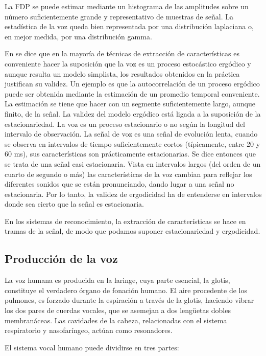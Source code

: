 La FDP se puede estimar mediante un histograma de las amplitudes sobre un número suficientemente grande y representativo de muestras de señal. La estadística de la voz queda bien representada por una distribución laplaciana o, en mejor medida, por una distribución gamma.

En \cite{Mesa} se dice que en la mayoría de técnicas de extracción de características es conveniente hacer la suposición que la voz es un proceso estocástico ergódico y aunque resulta un modelo simplista, los resultados obtenidos en la práctica justifican su validez. Un ejemplo es que la autocorrelación de un proceso ergódico puede ser obtenida mediante la estimación de un promedio temporal conveniente. La estimación se tiene que hacer con un segmente suficientemente largo, aunque finito, de la señal. La validez del modelo ergódico está ligada a la suposición de la estacionariedad. La voz es un proceso estacionario o no según la longitud del intervalo de observación. La señal de voz es una señal de evolución lenta, cuando se observa en intervalos de tiempo suficientemente cortos (típicamente, entre 20 y 60 ms), sus características son prácticamente estacionarias. Se dice entonces que se trata de una señal casi estacionaria. Vista en intervalos largos (del orden de un cuarto de segundo o más) las características de la voz cambian para reflejar los diferentes sonidos que se están pronunciando, dando lugar a una señal no estacionaria. Por lo tanto, la validez de ergodicidad ha de entenderse en intervalos donde sea cierto que la señal es estacionaria.

En los sistemas de reconocimiento, la extracción de características se hace en tramas de la señal, de modo que podamos suponer estacionariedad y ergodicidad.

\subsection{Producción de la voz}

La voz humana es producida en la laringe, cuya parte esencial, la glotis, constituye el verdadero órgano de fonación humano. El aire procedente de los pulmones, es forzado durante la espiración a través de la glotis, haciendo vibrar los dos pares de cuerdas vocales, que se asemejan a dos lengüetas dobles membranáceas. Las cavidades de la cabeza, relacionadas con el sistema respiratorio y nasofaríngeo, actúan como resonadores. \cite{GrupodeAcustica2002}

El sistema vocal humano puede dividirse en tres partes:

